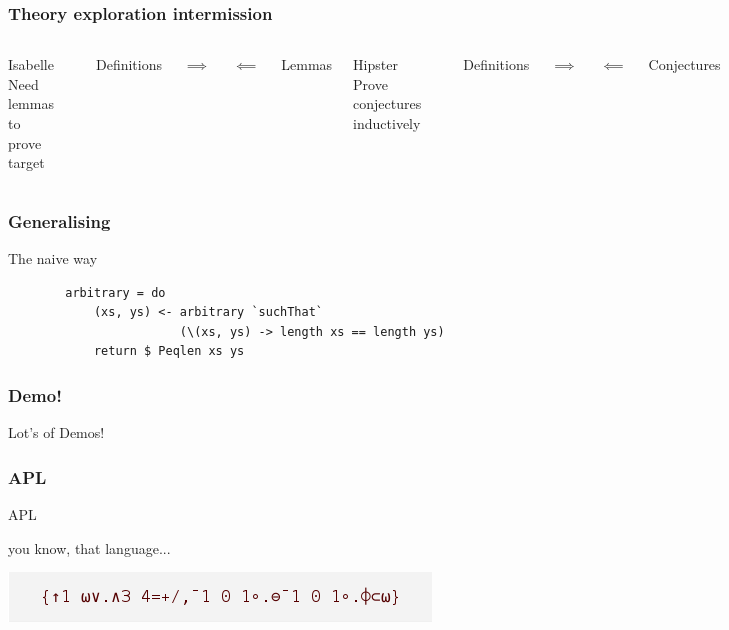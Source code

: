 \documentclass{beamer}
\begin{document}
\begin{frame}
    \frametitle{Theory exploration intermission}
    \begin{columns}
        \begin{block}{Isabelle}
            \small{Need lemmas to prove target}
        \end{block}

        \\
        \centerline{Definitions}
        \centerline{\Large{$\implies$}}
        \centerline{\Large{$\impliedby$}}
        \centerline{Lemmas}

        \begin{block}{Hipster}
            \small{Prove conjectures inductively}
        \end{block}
        
        \\
        \centerline{Definitions}
        \centerline{\Large{$\implies$}}
        \centerline{\Large{$\impliedby$}}
        \centerline{Conjectures}

        \begin{block}{QuickSpec}
            \small{Conjecture conjectures
            \\(we are here)}
        \end{block}

    \end{columns}
\end{frame}

\begin{frame}[fragile]
    \frametitle{Generalising}
    \centerline{The naive way}
    \begin{verbatim}
        arbitrary = do
            (xs, ys) <- arbitrary `suchThat`
                        (\(xs, ys) -> length xs == length ys)
            return $ Peqlen xs ys
        \end{verbatim}   
\end{frame}

\begin{frame}
    \frametitle{Demo!}
        \Huge{\centerline{Lot's of Demos!}}
\end{frame}

\begin{frame}[fragile]
    \frametitle{APL}
        \Huge{\centerline{APL}}
        \pause
        \small{\centerline{you know, that language...}}
        \centerline{}
        \centerline{\includegraphics[scale=0.5]{game_of_life.png}}
\end{frame}
\end{document}
